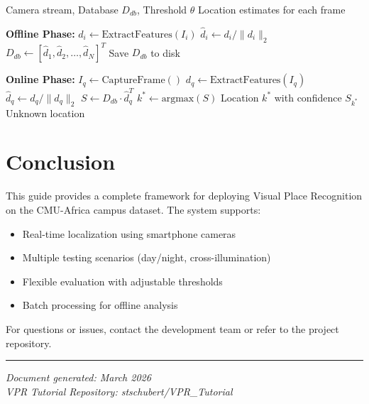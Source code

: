 \documentclass[11pt,a4paper]{article}
\begin{document}
\begin{algorithm}[H]
\caption{Live Visual Place Recognition}
\begin{algorithmic}[1]
\Require Camera stream, Database $D_{db}$, Threshold $\theta$
\Ensure Location estimates for each frame

\State \textbf{Offline Phase:}
    \State $d_i \gets \text{ExtractFeatures}(I_i)$
    \State $\hat{d}_i \gets d_i / \|d_i\|_2$
\EndFor
\State $D_{db} \gets [\hat{d}_1, \hat{d}_2, \ldots, \hat{d}_N]^T$
\State Save $D_{db}$ to disk

\State
\State \textbf{Online Phase:}
    \State $I_q \gets \text{CaptureFrame}()$
    \State $d_q \gets \text{ExtractFeatures}(I_q)$
    \State $\hat{d}_q \gets d_q / \|d_q\|_2$
    \State $S \gets D_{db} \cdot \hat{d}_q^T$ 
    \State $k^* \gets \text{argmax}(S)$
        \State \Return Location $k^*$ with confidence $S_{k^*}$
    \Else
        \State \Return Unknown location
    \EndIf
\EndWhile
\end{algorithmic}
\end{algorithm}

\section{Conclusion}

This guide provides a complete framework for deploying Visual Place Recognition on the CMU-Africa campus dataset. The system supports:

\begin{itemize}
    \item Real-time localization using smartphone cameras
    \item Multiple testing scenarios (day/night, cross-illumination)
    \item Flexible evaluation with adjustable thresholds
    \item Batch processing for offline analysis
\end{itemize}

For questions or issues, contact the development team or refer to the project repository.

\vspace{1cm}
\hrule
\vspace{0.5cm}
\textit{Document generated: March 2026}\\
\textit{VPR Tutorial Repository: stschubert/VPR\_Tutorial}
\end{document}
